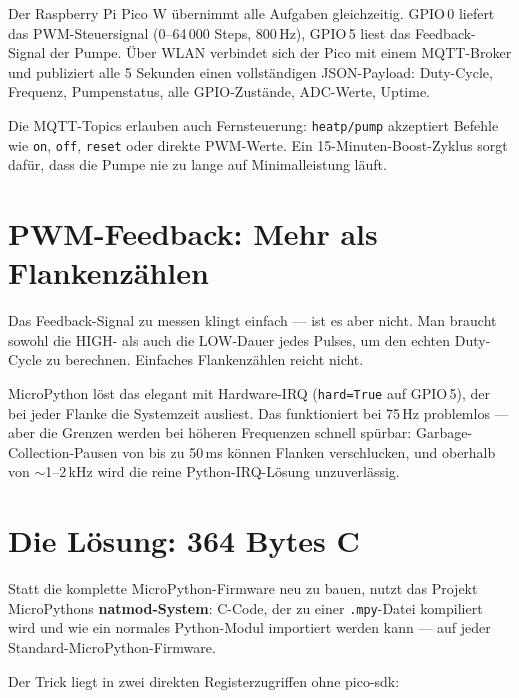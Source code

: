 \documentclass[11pt,a4paper]{article}
\begin{document}
Der Raspberry Pi Pico W übernimmt alle Aufgaben gleichzeitig.
GPIO\,0 liefert das PWM-Steuersignal (0--64\,000 Steps, 800\,Hz),
GPIO\,5 liest das Feedback-Signal der Pumpe.
Über WLAN verbindet sich der Pico mit einem MQTT-Broker und publiziert
alle 5 Sekunden einen vollständigen JSON-Payload:
Duty-Cycle, Frequenz, Pumpenstatus, alle GPIO-Zustände, ADC-Werte, Uptime.

Die MQTT-Topics erlauben auch Fernsteuerung:
\texttt{heatp/pump} akzeptiert Befehle wie \texttt{on}, \texttt{off},
\texttt{reset} oder direkte PWM-Werte. Ein 15-Minuten-Boost-Zyklus sorgt
dafür, dass die Pumpe nie zu lange auf Minimalleistung läuft.

\section{PWM-Feedback: Mehr als Flankenzählen}

Das Feedback-Signal zu messen klingt einfach --- ist es aber nicht.
Man braucht sowohl die HIGH- als auch die LOW-Dauer jedes Pulses,
um den echten Duty-Cycle zu berechnen. Einfaches Flankenzählen reicht nicht.

MicroPython löst das elegant mit Hardware-IRQ (\texttt{hard=True} auf GPIO\,5),
der bei jeder Flanke die Systemzeit ausliest. Das funktioniert bei 75\,Hz
problemlos --- aber die Grenzen werden bei höheren Frequenzen schnell spürbar:
Garbage-Collection-Pausen von bis zu 50\,ms können Flanken verschlucken,
und oberhalb von $\sim$1--2\,kHz wird die reine Python-IRQ-Lösung unzuverlässig.

\section{Die Lösung: 364 Bytes C}

Statt die komplette MicroPython-Firmware neu zu bauen, nutzt das Projekt
MicroPythons \textbf{natmod-System}: C-Code, der zu einer \texttt{.mpy}-Datei
kompiliert wird und wie ein normales Python-Modul importiert werden kann ---
auf jeder Standard-MicroPython-Firmware.

Der Trick liegt in zwei direkten Registerzugriffen ohne pico-sdk:
\end{document}
